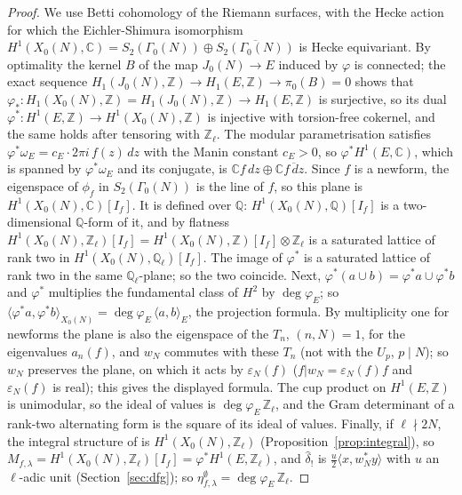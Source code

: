 \documentclass[11pt]{amsart}
\theoremstyle{definition}
\newcommand{\Q}{\mathbb{Q}}
\newcommand{\Z}{\mathbb{Z}}
\newcommand{\C}{\mathbb{C}}
\newcommand{\degphi}{\deg\varphi_E}
\begin{document}
\begin{proof}
We use Betti cohomology of the Riemann surfaces, with the Hecke action for which the Eichler-Shimura isomorphism $H^1(X_0(N),\C)=S_2(\Gamma_0(N))\oplus\overline{S_2(\Gamma_0(N))}$ is Hecke equivariant. By optimality the kernel $B$ of the map $J_0(N)\to E$ induced by $\varphi$ is connected; the exact sequence $H_1(J_0(N),\Z)\to H_1(E,\Z)\to\pi_0(B)=0$ shows that $\varphi_*\colon H_1(X_0(N),\Z)=H_1(J_0(N),\Z)\to H_1(E,\Z)$ is surjective, so its dual $\varphi^*\colon H^1(E,\Z)\to H^1(X_0(N),\Z)$ is injective with torsion-free cokernel, and the same holds after tensoring with $\Z_\ell$. The modular parametrisation satisfies $\varphi^*\omega_E=c_E\cdot2\pi i\,f(z)\,dz$ with the Manin constant $c_E>0$, so $\varphi^*H^1(E,\C)$, which is spanned by $\varphi^*\omega_E$ and its conjugate, is $\C f\,dz\oplus\C\overline{f\,dz}$. Since $f$ is a newform, the eigenspace of $\phi_f$ in $S_2(\Gamma_0(N))$ is the line of $f$, so this plane is $H^1(X_0(N),\C)[I_f]$. It is defined over $\Q$: $H^1(X_0(N),\Q)[I_f]$ is a two-dimensional $\Q$-form of it, and by flatness $H^1(X_0(N),\Z_\ell)[I_f]=H^1(X_0(N),\Z)[I_f]\otimes\Z_\ell$ is a saturated lattice of rank two in $H^1(X_0(N),\Q_\ell)[I_f]$. The image of $\varphi^*$ is a saturated lattice of rank two in the same $\Q_\ell$-plane; so the two coincide. Next, $\varphi^*(a\cup b)=\varphi^*a\cup\varphi^*b$ and $\varphi^*$ multiplies the fundamental class of $H^2$ by $\degphi$; so $\langle\varphi^*a,\varphi^*b\rangle_{X_0(N)}=\degphi\,\langle a,b\rangle_E$, the projection formula. By multiplicity one for newforms the plane is also the eigenspace of the $T_n$, $(n,N)=1$, for the eigenvalues $a_n(f)$, and $w_N$ commutes with these $T_n$ (not with the $U_p$, $p\mid N$); so $w_N$ preserves the plane, on which it acts by $\varepsilon_N(f)$ ($f|w_N=\varepsilon_N(f)f$ and $\varepsilon_N(f)$ is real); this gives the displayed formula. The cup product on $H^1(E,\Z)$ is unimodular, so the ideal of values is $\degphi\,\Z_\ell$, and the Gram determinant of a rank-two alternating form is the square of its ideal of values. Finally, if $\ell\nmid2N$, the integral structure of \cite{DFG04} is $H^1(X_0(N),\Z_\ell)$ (Proposition~\ref{prop:integral}), so $M_{f,\lambda}=H^1(X_0(N),\Z_\ell)[I_f]=\varphi^*H^1(E,\Z_\ell)$, and $\hat\delta_!$ is $\frac u2\langle x,w_N^*y\rangle$ with $u$ an $\ell$-adic unit (Section~\ref{sec:dfg}); so $\eta^\emptyset_{f,\lambda}=\degphi\,\Z_\ell$.
\end{proof}
\end{document}
